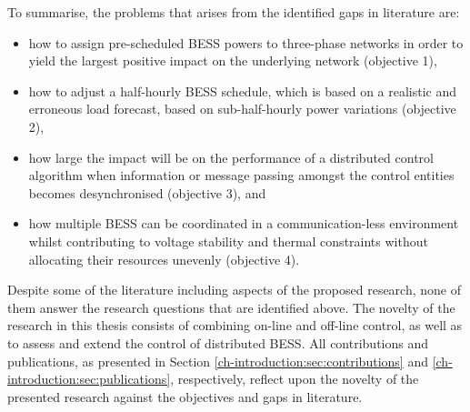 To summarise, the problems that arises from the identified gaps in literature are:

\begin{itemize}
	\item how to assign pre-scheduled BESS powers to three-phase networks in order to yield the largest positive impact on the underlying network (objective 1),
	\item how to adjust a half-hourly BESS schedule, which is based on a realistic and erroneous load forecast, based on sub-half-hourly power variations (objective 2),
	\item how large the impact will be on the performance of a distributed control algorithm when information or message passing amongst the control entities becomes desynchronised (objective 3), and
	\item how multiple BESS can be coordinated in a communication-less environment whilst contributing to voltage stability and thermal constraints without allocating their resources unevenly (objective 4).
\end{itemize}

Despite some of the literature including aspects of the proposed research, none of them answer the research questions that are identified above.
The novelty of the research in this thesis consists of combining on-line and off-line control, as well as to assess and extend the control of distributed BESS.
All contributions and publications, as presented in Section \ref{ch-introduction:sec:contributions} and \ref{ch-introduction:sec:publications}, respectively, reflect upon the novelty of the presented research against the objectives and gaps in literature.

